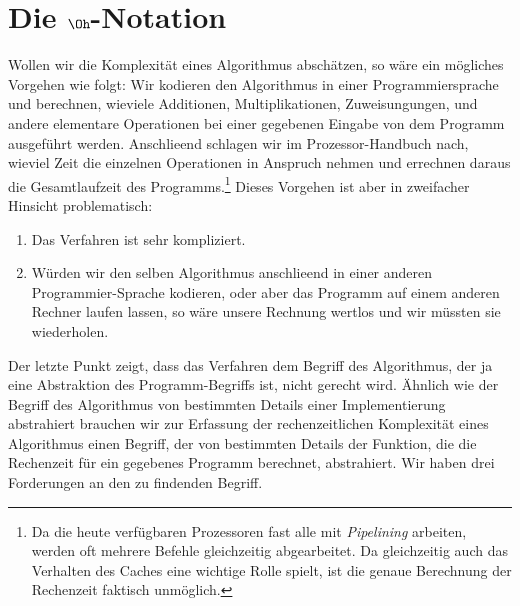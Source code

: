 \section{Die $\Oh$-Notation}
Wollen wir die Komplexit\"at eines Algorithmus absch\"atzen, so w\"are ein m\"ogliches Vorgehen
wie folgt: Wir kodieren den Algorithmus in einer Programmiersprache und berechnen,
wieviele Additionen, Multiplikationen, Zuweisungungen, und andere elementare Operationen
bei einer gegebenen Eingabe von dem Programm ausgef\"uhrt werden. Anschlie\3end schlagen wir
im Prozessor-Handbuch nach, wieviel Zeit die einzelnen Operationen in Anspruch nehmen und
errechnen daraus die Gesamtlaufzeit des Programms.\footnote{
Da die heute verf\"ugbaren Prozessoren fast alle mit \emph{Pipelining} arbeiten, werden oft
mehrere Befehle gleichzeitig abgearbeitet. Da gleichzeitig auch das Verhalten des Caches
eine wichtige Rolle spielt, ist die genaue Berechnung der Rechenzeit faktisch unm\"oglich.}
Dieses Vorgehen ist aber in zweifacher Hinsicht problematisch:
\begin{enumerate}
\item Das Verfahren ist sehr kompliziert.
\item W\"urden wir den selben Algorithmus anschlie\3end in einer anderen Programmier-Sprache
      kodieren, oder aber das Programm auf einem anderen Rechner laufen lassen, so w\"are
      unsere Rechnung wertlos und wir m\"ussten sie wiederholen.
\end{enumerate}
Der letzte Punkt zeigt, dass das Verfahren dem Begriff des Algorithmus, der ja eine
Abstraktion des Programm-Begriffs ist, nicht gerecht wird.  Ähnlich wie der Begriff des
Algorithmus von bestimmten Details einer Implementierung abstrahiert brauchen wir zur
Erfassung der rechenzeitlichen Komplexit\"at eines Algorithmus einen Begriff, der von
bestimmten Details der Funktion, die die Rechenzeit f\"ur ein gegebenes Programm berechnet,
abstrahiert.  Wir haben drei Forderungen an den zu findenden  Begriff.
